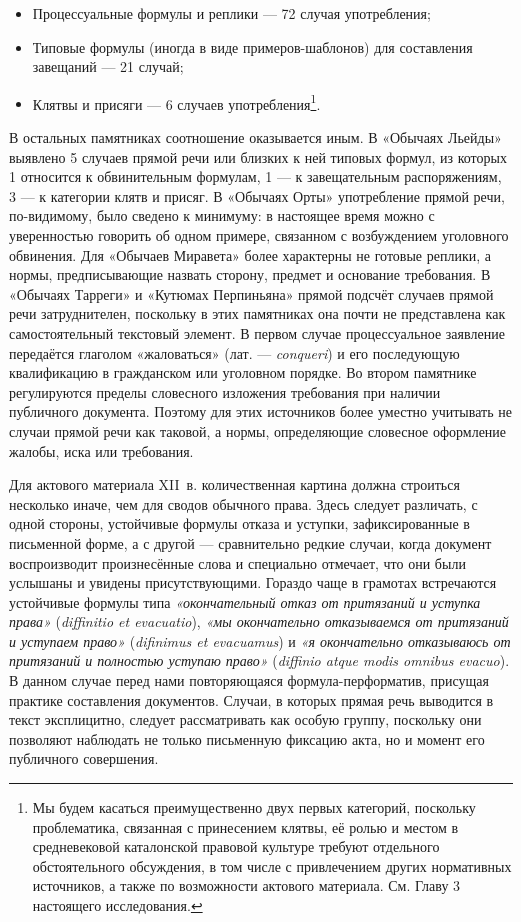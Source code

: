 \begin{itemize}
\item Процессуальные формулы и реплики --- 72 случая употребления;
\item Типовые формулы (иногда в виде примеров-шаблонов) для составления завещаний --- 21 случай;
\item Клятвы и присяги --- 6 случаев употребления\footnote{Мы будем касаться преимущественно двух первых категорий, поскольку проблематика, связанная с принесением клятвы, её ролью и местом в средневековой каталонской правовой культуре требуют отдельного обстоятельного обсуждения, в том числе с привлечением других нормативных источников, а также по возможности актового материала. См. Главу 3 настоящего исследования.}.
\end{itemize}
В остальных памятниках соотношение оказывается иным. В «Обычаях Льейды» выявлено 5 случаев прямой речи или близких к ней типовых формул, из которых 1 относится к обвинительным формулам, 1 --- к завещательным распоряжениям, 3 --- к категории клятв и присяг. В «Обычаях Орты» употребление прямой речи, по-видимому, было сведено к минимуму: в настоящее время можно с уверенностью говорить об одном примере, связанном с возбуждением уголовного обвинения. Для «Обычаев Миравета» более характерны не готовые реплики, а нормы, предписывающие назвать сторону, предмет и основание требования. В «Обычаях Тарреги» и «Кутюмах Перпиньяна» прямой подсчёт случаев прямой речи затруднителен, поскольку в этих памятниках она почти не представлена как самостоятельный текстовый элемент. В первом случае процессуальное заявление передаётся глаголом «жаловаться» (лат. --- \emph{conqueri}) и его последующую квалификацию в гражданском или уголовном порядке. Во втором памятнике регулируются пределы словесного изложения требования при наличии публичного документа. Поэтому для этих источников более уместно учитывать не случаи прямой речи как таковой, а нормы, определяющие словесное оформление жалобы, иска или требования.

Для актового материала XII~в. количественная картина должна строиться несколько иначе, чем для сводов обычного права. Здесь следует различать, с одной стороны, устойчивые формулы отказа и уступки, зафиксированные в письменной форме, а с другой --- сравнительно редкие случаи, когда документ воспроизводит произнесённые слова и специально отмечает, что они были услышаны и увидены присутствующими. Гораздо чаще в грамотах встречаются устойчивые формулы типа \emph{«окончательный отказ от притязаний и уступка права»} (\emph{diffinitio et evacuatio}), \emph{«мы окончательно отказываемся от притязаний и уступаем право» }(\emph{difinimus et evacuamus}) и \emph{«я окончательно отказываюсь от притязаний и полностью уступаю право»} (\emph{diffinio atque modis omnibus evacuo}). В данном случае перед нами повторяющаяся формула-перформатив, присущая практике составления документов. Случаи, в которых прямая речь выводится в текст эксплицитно, следует рассматривать как особую группу, поскольку они позволяют наблюдать не только письменную фиксацию акта, но и момент его публичного совершения.


